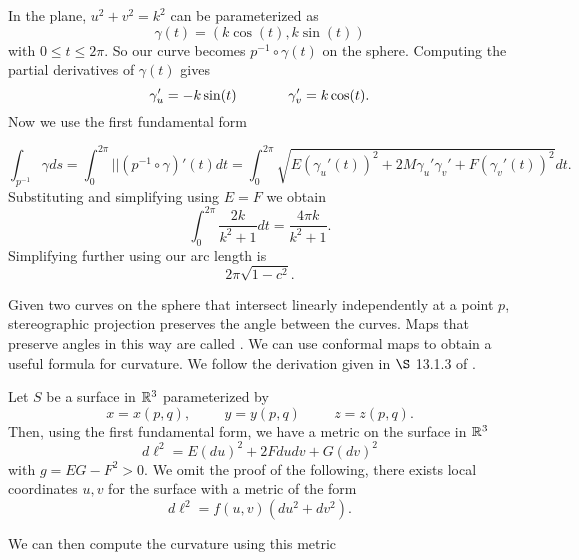 \begin{example}
In the plane, $u^2+v^2=k^2$ can be parameterized
as $$\gamma(t)=(k\cos(t),k\sin(t))$$ with $0\leq t\leq 2\pi.$
So our curve becomes $p^{-1}\circ \gamma(t)$ on the sphere.
Computing the partial derivatives of $\gamma(t)$ gives
$$\gamma_u'=-k\sin(t)\hspace{1.3cm}  \gamma_v'=k\cos(t).$$
Now we use the first fundamental form

$$\int_{p^{-1}}\gamma ds=\int_{0}^{2\pi} ||(p^{-1}\circ \gamma)'(t)dt=\int_0^{2\pi}\sqrt{E(\gamma_u'(t))^2+2M\gamma_u'\gamma_v'+
F(\gamma_v'(t))^2}dt.$$
Substituting and simplifying using $E=F$ we obtain
$$\int_0^{2\pi}\frac{2k}{k^2+1}dt=\frac{4\pi k}{k^2+1}.$$
Simplifying further using   our arc length is
$$2\pi\sqrt{1-c^2}.$$

\end{example}



Given two curves on the sphere that intersect linearly independently at a point $p$, 
stereographic projection preserves the angle between the curves.
Maps that preserve angles in this way are called .
We can use conformal maps to obtain a useful formula for curvature.
We follow the derivation given in $\S$ 13.1.3 of \cite{dubrovin_modern_1984}.

Let $S$ be a surface in $\mathbb{R}^3$ parameterized by
$$x=x(p,q), \hspace{1cm}  y=y(p,q)  \hspace{1cm} z=z(p,q).$$
Then, using the  first fundamental form, we have a metric on the surface in $\mathbb{R}^3$
$$d\ell^2=E(du)^2+2Fdudv + G(dv)^2$$
with $g=EG-F^2>0.$ 
We omit the proof of the following, there exists local coordinates $u,v$ for the surface with a metric of the form
$$d\ell^2=f(u,v)(du^2+dv^2).$$ 

We can then compute the curvature using this metric


